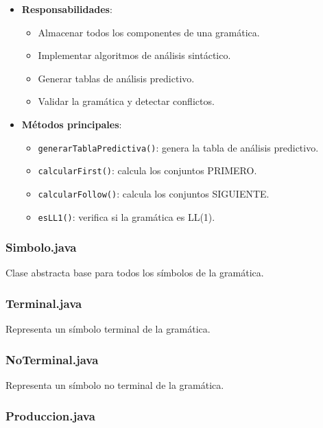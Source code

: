 \begin{itemize}
    \item \textbf{Responsabilidades}:
    \begin{itemize}
        \item Almacenar todos los componentes de una gramática.
        \item Implementar algoritmos de análisis sintáctico.
        \item Generar tablas de análisis predictivo.
        \item Validar la gramática y detectar conflictos.
    \end{itemize}
    \item \textbf{Métodos principales}:
    \begin{itemize}
        \item \texttt{generarTablaPredictiva()}: genera la tabla de análisis predictivo.
        \item \texttt{calcularFirst()}: calcula los conjuntos PRIMERO.
        \item \texttt{calcularFollow()}: calcula los conjuntos SIGUIENTE.
        \item \texttt{esLL1()}: verifica si la gramática es LL(1).
    \end{itemize}
\end{itemize}

\subsubsection{Simbolo.java}

Clase abstracta base para todos los símbolos de la gramática.

\subsubsection{Terminal.java}

Representa un símbolo terminal de la gramática.

\subsubsection{NoTerminal.java}

Representa un símbolo no terminal de la gramática.

\subsubsection{Produccion.java}

